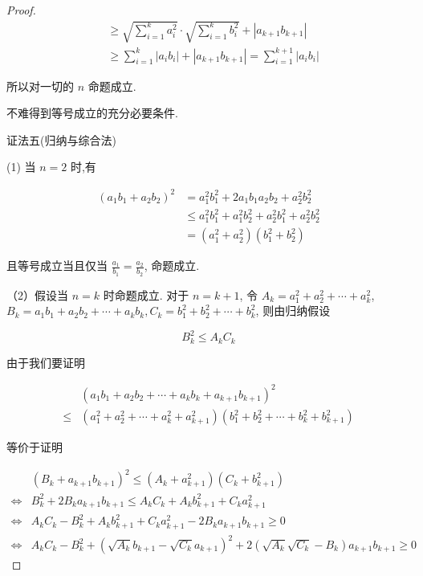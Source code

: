 \begin{proof}
	$$
	\begin{aligned}
	& \geqslant \sqrt{\sum_{i=1}^{k} a_{i}^{2}} \cdot \sqrt{\sum_{i=1}^{k} b_{i}^{2}}+\left|a_{k+1} b_{k+1}\right| \\
	& \geqslant \sum_{i=1}^{k}\left|a_{i} b_{i}\right|+\left|a_{k+1} b_{k+1}\right|=\sum_{i=1}^{k+1}\left|a_{i} b_{i}\right|
	\end{aligned}
	$$
	
	所以对一切的 $n$ 命题成立.
	
	不难得到等号成立的充分必要条件.
	
	证法五(归纳与综合法)
	
	(1) 当 $n=2$ 时,有
	
	$$
	\begin{aligned}
	\left(a_{1} b_{1}+a_{2} b_{2}\right)^{2} & =a_{1}^{2} b_{1}^{2}+2 a_{1} b_{1} a_{2} b_{2}+a_{2}^{2} b_{2}^{2} \\
	& \leqslant a_{1}^{2} b_{1}^{2}+a_{1}^{2} b_{2}^{2}+a_{2}^{2} b_{1}^{2}+a_{2}^{2} b_{2}^{2} \\
	& =\left(a_{1}^{2}+a_{2}^{2}\right)\left(b_{1}^{2}+b_{2}^{2}\right)
	\end{aligned}
	$$
	
	且等号成立当且仅当 $\frac{a_{1}}{b_{1}}=\frac{a_{2}}{b_{2}}$, 命题成立.
	
	（2）假设当 $n=k$ 时命题成立. 对于 $n=k+1$, 令 $A_{k}=a_{1}^{2}+a_{2}^{2}+\cdots+a_{k}^{2}$, $B_{k}=a_{1} b_{1}+a_{2} b_{2}+\cdots+a_{k} b_{k}, C_{k}=b_{1}^{2}+b_{2}^{2}+\cdots+b_{k}^{2}$, 则由归纳假设
	
	$$
	B_{k}^{2} \leqslant A_{k} C_{k}
	$$
	
	由于我们要证明
	
	$$
	\begin{aligned}
	& \left(a_{1} b_{1}+a_{2} b_{2}+\cdots+a_{k} b_{k}+a_{k+1} b_{k+1}\right)^{2} \\
	\leqslant & \left(a_{1}^{2}+a_{2}^{2}+\cdots+a_{k}^{2}+a_{k+1}^{2}\right)\left(b_{1}^{2}+b_{2}^{2}+\cdots+b_{k}^{2}+b_{k+1}^{2}\right)
	\end{aligned}
	$$
	
	等价于证明
	
	$$
	\begin{aligned}
	& \left(B_{k}+a_{k+1} b_{k+1}\right)^{2} \leqslant\left(A_{k}+a_{k+1}^{2}\right)\left(C_{k}+b_{k+1}^{2}\right) \\
	\Leftrightarrow & B_{k}^{2}+2 B_{k} a_{k+1} b_{k+1} \leqslant A_{k} C_{k}+A_{k} b_{k+1}^{2}+C_{k} a_{k+1}^{2} \\
	\Leftrightarrow & A_{k} C_{k}-B_{k}^{2}+A_{k} b_{k+1}^{2}+C_{k} a_{k+1}^{2}-2 B_{k} a_{k+1} b_{k+1} \geqslant 0 \\
	\Leftrightarrow & A_{k} C_{k}-B_{k}^{2}+\left(\sqrt{A_{k}} b_{k+1}-\sqrt{C_{k}} a_{k+1}\right)^{2}+2\left(\sqrt{A_{k}} \sqrt{C_{k}}-B_{k}\right) a_{k+1} b_{k+1} \geqslant 0
	\end{aligned}
	$$
	

\end{proof}

